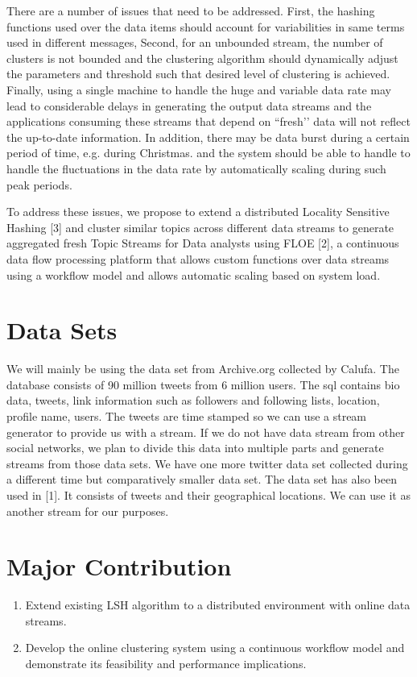 \documentclass{article} %
\begin{document}
There are a number of issues that need to be addressed. First, the hashing functions used over the data items should account for variabilities in same terms used in different messages,  Second, for an unbounded stream, the number of clusters is not bounded and the clustering algorithm should dynamically adjust the parameters and threshold such that desired level of clustering is achieved. Finally, using a single machine to handle the huge and variable data rate may lead to considerable delays in generating the output data streams and the applications consuming these streams that depend on “fresh’’ data will not reflect the up-to-date information. In addition, there may be data burst during a certain period of time, e.g. during Christmas. and the system should be able to handle to handle the fluctuations in the data rate by automatically scaling during such peak periods. 


To address these issues, we propose to extend a distributed Locality Sensitive Hashing [3] and cluster similar topics across different data streams to generate aggregated fresh Topic Streams for Data analysts using FLOE [2], a continuous data flow processing platform that allows custom functions over data streams using a workflow model and allows automatic scaling based on system load. 

\section{Data Sets}
We will mainly be using the data set from Archive.org collected by Calufa. The database consists of 90 million tweets from 6 million users. The sql contains bio data, tweets, link information such as followers and following lists, location, profile name, users. The tweets are time stamped so we can use a stream generator to provide us with a stream. If we do not have data stream from other social networks, we plan to divide this data into multiple parts and generate streams from those data sets. 
We have one more twitter data set collected during a different time but comparatively smaller data set. The data set has also been used in [1]. It consists of tweets and their geographical locations. We can use it as another stream for our purposes.

\section{Major Contribution}
\begin{enumerate}
\item Extend existing LSH algorithm to a distributed environment with online data streams.
\item Develop the online clustering system using a continuous workflow model and demonstrate its feasibility and performance implications.

\end{enumerate}
\end{document}
